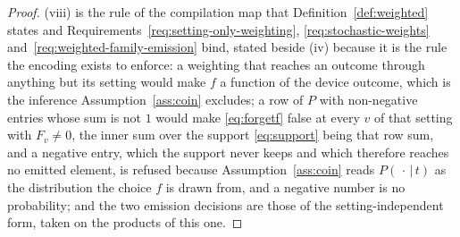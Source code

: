 \begin{proof}
(viii) is the rule of the compilation map that Definition~\ref{def:weighted}
states and Requirements~\ref{req:setting-only-weighting},
\ref{req:stochastic-weights} and~\ref{req:weighted-family-emission} bind,
stated beside (iv) because it is the rule the encoding exists to enforce: a
weighting that reaches an outcome through anything but its setting would make
$f$ a function of the device outcome, which is the inference
Assumption~\ref{ass:coin} excludes; a row of $P$ with non-negative entries
whose sum is not $1$ would make \eqref{eq:forgetf} false at every $v$ of that
setting with $F_v\ne0$, the inner sum over the support \eqref{eq:support}
being that row sum, and a negative entry, which the support never keeps and
which therefore reaches no emitted element, is refused because
Assumption~\ref{ass:coin} reads $P(\,\cdot\,|\,t)$ as the distribution the
choice $f$ is drawn from, and a negative number is no probability; and
the two emission decisions are those of the setting-independent form, taken on
the products of this one.
\end{proof}
